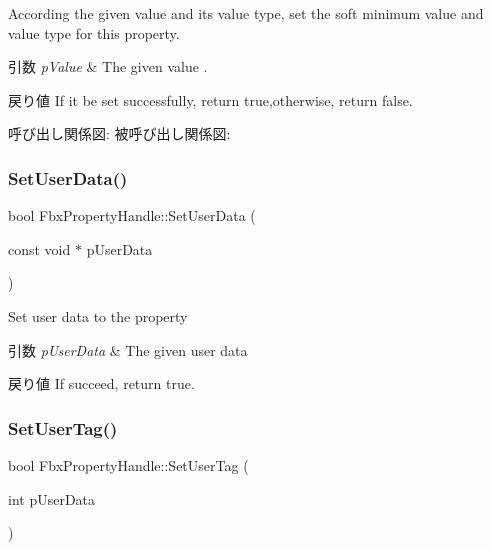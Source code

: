 According the given value and its value type, set the soft minimum value and value type for this property. 
\begin{DoxyParams}{引数}
{\em p\+Value} & The given value . \\
\hline
\end{DoxyParams}
\begin{DoxyReturn}{戻り値}
If it be set successfully, return true,otherwise, return false. 
\end{DoxyReturn}
呼び出し関係図\+:
被呼び出し関係図\+:
\mbox{\label{class_fbx_property_handle_ac8ae1291fa5e34f1eb1373a42e8245c8}} 
\subsubsection{\texorpdfstring{Set\+User\+Data()}{SetUserData()}}
{\footnotesize\ttfamily bool Fbx\+Property\+Handle\+::\+Set\+User\+Data (\begin{DoxyParamCaption}\item[{const void $\ast$}]{p\+User\+Data }\end{DoxyParamCaption})}

Set user data to the property 
\begin{DoxyParams}{引数}
{\em p\+User\+Data} & The given user data \\
\hline
\end{DoxyParams}
\begin{DoxyReturn}{戻り値}
If succeed, return true. 
\end{DoxyReturn}
\mbox{\label{class_fbx_property_handle_a41eff619689a61cf283d9913429a6221}} 
\subsubsection{\texorpdfstring{Set\+User\+Tag()}{SetUserTag()}}
{\footnotesize\ttfamily bool Fbx\+Property\+Handle\+::\+Set\+User\+Tag (\begin{DoxyParamCaption}\item[{int}]{p\+User\+Data }\end{DoxyParamCaption})}

